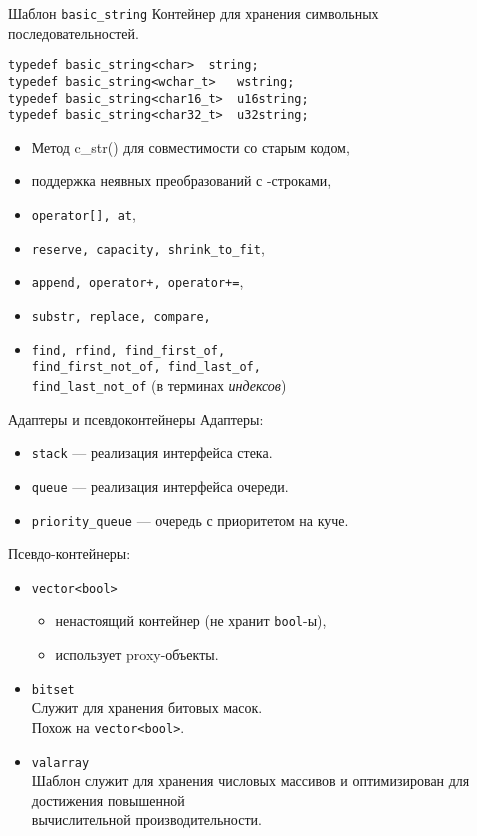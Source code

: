 \documentclass{beamer}
\begin{document}
\begin{frame}[fragile]{Шаблон {\tt basic\_string}}
Контейнер для хранения символьных последовательностей.
\begin{lstlisting}
typedef basic_string<char>	string;
typedef basic_string<wchar_t> 	wstring;
typedef basic_string<char16_t> 	u16string;
typedef basic_string<char32_t>	u32string;
\end{lstlisting}
\begin{itemize}
    \item Метод {c\_str()} для совместимости со старым кодом, 
    \item поддержка неявных преобразований с \langc-строками,
    \item \texttt{operator[], at},
    \item \texttt{reserve, capacity, shrink\_to\_fit},
    \item \texttt{append, operator+, operator+=},
    \item \texttt{substr, replace, compare,} 
    \item \texttt{find, rfind, find\_first\_of,\\ find\_first\_not\_of,
    find\_last\_of,\\ find\_last\_not\_of} (в терминах {\em индексов})
\end{itemize}
\end{frame}

\begin{frame}{Адаптеры и псевдоконтейнеры}
    Адаптеры:
    \begin{itemize}
        \item {\tt stack} —
            реализация интерфейса стека.

        \item {\tt queue} —
            реализация интерфейса очереди.

        \item {\tt priority\_queue} —
            очередь с приоритетом на куче.
    \end{itemize}
    
    Псевдо-контейнеры:
    \begin{itemize}
        \item {\tt vector<bool>}
        \begin{itemize}
            \item ненастоящий контейнер (не хранит {\tt bool}-ы),
            \item использует proxy-объекты.
        \end{itemize}
        \item {\tt bitset}\\
            Служит для хранения битовых масок.\\ Похож на
            {\tt vector<bool>}.
                        
        \item {\tt valarray}\\
            Шаблон служит для хранения числовых массивов
            и оптимизирован для достижения повышенной\\ вычислительной
            производительности. 
    \end{itemize}
\end{frame}
\end{document}
